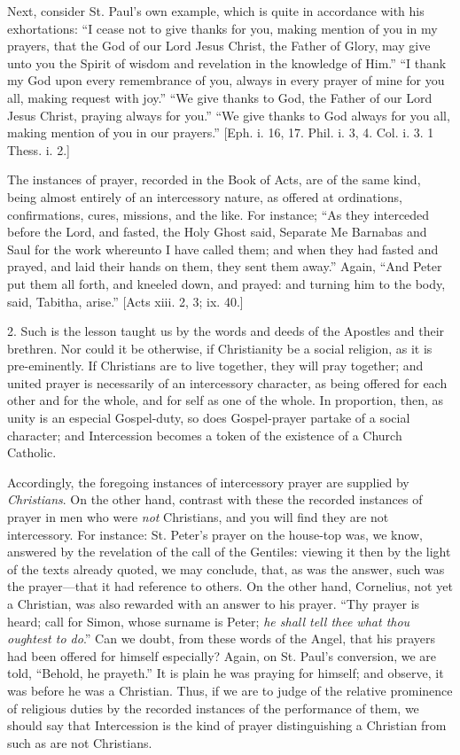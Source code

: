 Next, consider St. Paul's own example, which is quite in
accordance with his exhortations: ``I cease not to give thanks for
you, making mention of you in my prayers, that the God of our Lord
Jesus Christ, the Father of Glory, may give unto you the Spirit of
wisdom and revelation in the knowledge of Him.'' ``I thank my
God upon every remembrance of you, always in every prayer of mine for
you all, making request with joy.'' ``We give thanks to God,
the Father of our Lord Jesus Christ, praying always for you.''
``We give thanks to God always for you all, making mention of you
in our prayers.'' [Eph. i. 16, 17. Phil. i. 3, 4. Col. i. 3. 1
Thess. i. 2.]

The instances of prayer, recorded in the Book of Acts, are of the
same kind, being almost entirely of an intercessory nature, as offered
at ordinations, confirmations, cures, missions, and the like. For
instance; ``As they interceded before the Lord, and fasted, the
Holy Ghost said, Separate Me Barnabas and Saul for the work whereunto
I have called them; and when they had fasted and prayed, and laid
their hands on them, they sent them away.'' Again, ``And Peter
put them all forth, and kneeled down, and prayed: and turning him to
the body, said, Tabitha, arise.'' [Acts xiii. 2, 3; ix. 40.]

2. Such is the lesson taught us by the words and deeds of the
Apostles and their brethren. Nor could it be otherwise, if
Christianity be a social religion, as it is pre-eminently. If
Christians are to live together, they will pray together; and united
prayer is necessarily of an intercessory character, as being offered
for each other and for the whole, and for self as one of the whole. In
proportion, then, as unity is an especial Gospel-duty, so does
Gospel-prayer partake of a social character; and Intercession becomes
a token of the existence of a Church Catholic.

Accordingly, the foregoing instances of intercessory prayer are
supplied by \emph{Christians}. On the other hand, contrast with these
the recorded instances of prayer in men who were \emph{not}
Christians, and you will find they are not intercessory. For instance:
St. Peter's prayer on the house-top was, we know, answered by the
revelation of the call of the Gentiles: viewing it then by the light
of the texts already quoted, we may conclude, that, as was the answer,
such was the prayer—that it had reference to others. On the other
hand, Cornelius, not yet a Christian, was also rewarded with an answer
to his prayer. ``Thy prayer is heard; call for Simon, whose
surname is Peter; \emph{he shall tell thee what thou oughtest to do}.''
Can we doubt, from these words of the Angel, that his prayers had been
offered for himself especially? Again, on St. Paul's conversion, we
are told, ``Behold, he prayeth.'' It is plain he was praying
for himself; and observe, it was before he was a Christian. Thus, if
we are to judge of the relative prominence of religious duties by the
recorded instances of the performance of them, we should say that
Intercession is the kind of prayer distinguishing a Christian from
such as are not Christians.

